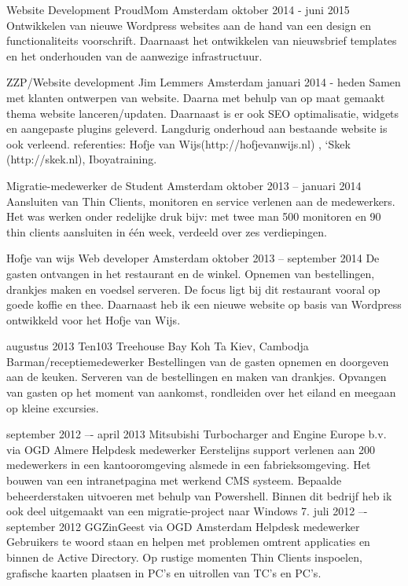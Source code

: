 \begin{cventries}
  \cventry
    {Website Development}
    {ProudMom}
    {Amsterdam}
    {oktober 2014 - juni 2015}
    {Ontwikkelen van nieuwe Wordpress websites aan de hand van een design en functionaliteits voorschrift. Daarnaast het ontwikkelen van nieuwsbrief templates en het onderhouden van de aanwezige infrastructuur.}
    
  \cventry
    {ZZP/Website development}
    {Jim Lemmers}
    {Amsterdam}
    {januari 2014 - heden}
    {Samen met klanten ontwerpen van  website. Daarna met behulp van op maat gemaakt thema  website lanceren/updaten. Daarnaast is er ook SEO optimalisatie, widgets en aangepaste plugins geleverd. Langdurig onderhoud aan bestaande website is ook verleend. 
    referenties: Hofje van Wijs(http://hofjevanwijs.nl) , ‘Skek (http://skek.nl), Iboyatraining.}

\iffalse
  \cventry
    {Migratie-medewerker}
    {de Student}
    {Amsterdam}
    {oktober 2013 -- januari 2014}
    {Aansluiten van Thin Clients, monitoren en service verlenen aan de medewerkers. Het was werken onder redelijke druk bijv: met twee man 500 monitoren en 90 thin clients aansluiten in één week, verdeeld over zes verdiepingen.}

  \cventry
    {Hofje van wijs}
    {Web developer}
    {Amsterdam}
    {oktober 2013 -- september 2014}
    {De gasten ontvangen in het restaurant en de winkel. Opnemen van bestellingen, drankjes maken en voedsel serveren. De focus ligt bij dit restaurant vooral op goede koffie en thee. Daarnaast heb ik een nieuwe website op basis van Wordpress ontwikkeld voor het Hofje van Wijs.}

  \cventry
    {augustus 2013}
    {Ten103 Treehouse Bay}
    {Koh Ta Kiev, Cambodja}
    {Barman/receptiemedewerker}
    {Bestellingen van de gasten opnemen en doorgeven aan de keuken. Serveren van de bestellingen en maken van drankjes. Opvangen van gasten op het moment van aankomst, rondleiden over het eiland en meegaan op kleine excursies.}

  \cventry
    {september 2012 –- april 2013}
    {Mitsubishi Turbocharger and Engine Europe b.v. via OGD}
    {Almere}
    {Helpdesk medewerker}
    {Eerstelijns support verlenen aan 200 medewerkers in een kantooromgeving alsmede in een fabrieksomgeving. Het bouwen van een intranetpagina met werkend CMS systeem. Bepaalde beheerderstaken uitvoeren met behulp van Powershell. Binnen dit bedrijf heb ik ook deel uitgemaakt van een migratie-project naar Windows 7.}
\iffalse
  \cventry
    {juli 2012 –- september 2012}
    {GGZinGeest via OGD}
    {Amsterdam}
    {Helpdesk medewerker}
    {Gebruikers te woord staan en helpen met problemen omtrent applicaties en binnen de Active Directory. Op rustige momenten Thin Clients inspoelen, grafische kaarten plaatsen in PC's en uitrollen van TC's en PC's. }


\end{cventries}
